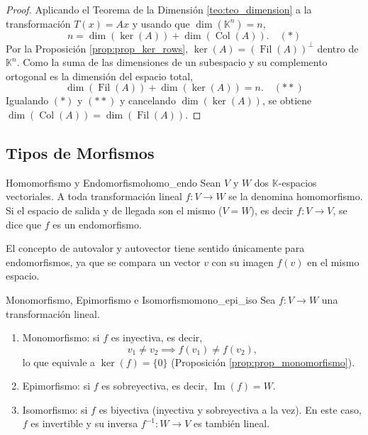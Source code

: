 \documentclass[11pt, a4paper]{article}
\begin{document}
\begin{proof}
Aplicando el Teorema de la Dimensión \ref{teo:teo_dimension} a la transformación $T(x) = Ax$ y usando que $\dim(\mathbb{K}^n) = n$,
\[ n = \dim(\ker(A)) + \dim(\operatorname{Col}(A)). \quad (*) \]
Por la Proposición \ref{prop:prop_ker_rows}, $\ker(A) = (\operatorname{Fil}(A))^\perp$ dentro de $\mathbb{K}^n$. Como la suma de las dimensiones de un subespacio y su complemento ortogonal es la dimensión del espacio total,
\[ \dim(\operatorname{Fil}(A)) + \dim(\ker(A)) = n. \quad (**) \]
Igualando $(*)$ y $(**)$ y cancelando $\dim(\ker(A))$, se obtiene $\dim(\operatorname{Col}(A)) = \dim(\operatorname{Fil}(A))$.
\end{proof}

\subsection{Tipos de Morfismos}

\begin{definicion}{Homomorfismo y Endomorfismo}{homo_endo}
Sean $V$ y $W$ dos $\mathbb{K}$-espacios vectoriales. A toda transformación lineal $f: V \to W$ se la denomina homomorfismo.
Si el espacio de salida y de llegada son el mismo ($V = W$), es decir $f: V \to V$, se dice que $f$ es un endomorfismo.

\end{definicion}

\obs El concepto de autovalor y autovector tiene sentido únicamente para endomorfismos, ya que se compara un vector $v$ con su imagen $f(v)$ en el mismo espacio.

\begin{definicion}{Monomorfismo, Epimorfismo e Isomorfismo}{mono_epi_iso}
Sea $f: V \to W$ una transformación lineal.
\begin{enumerate}
    \item Monomorfismo: si $f$ es inyectiva, es decir,
    \[ v_1 \neq v_2 \implies f(v_1) \neq f(v_2), \]
    lo que equivale a $\ker(f) = \{0\}$ (Proposición \ref{prop:prop_monomorfismo}).
    \item Epimorfismo: si $f$ es sobreyectiva, es decir, $\operatorname{Im}(f) = W$.
    \item Isomorfismo: si $f$ es biyectiva (inyectiva y sobreyectiva a la vez). En este caso, $f$ es invertible y su inversa $f^{-1}: W \to V$ es también lineal.
\end{enumerate}
\end{definicion}
\end{document}
